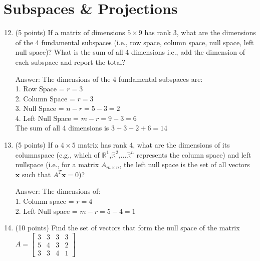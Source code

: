 \documentclass{article}%
\begin{document}
\section*{Subspaces \& Projections}
\begin{enumerate}
    \setcounter{enumi}{11}
        \item (5 points) If a matrix of dimensions $5 \times 9$ has rank 3, what are the dimensions of the 4 fundamental subspaces (i.e., row space, column space, null space, left null space)? What is the sum of all 4 dimensions i.e., add the dimension of each subspace and report the total?


         Answer: The dimensions of the 4 fundamental subspaces are: \\
         1. Row Space = $r = 3$ \\
         2. Column Space = $r = 3$ \\
         3. Null Space = $n - r = 5 - 3 = 2$ \\
         4. Left Null Space = $m - r = 9 - 3 = 6$ \\
         The sum of all 4 dimensions is $3 + 3 + 2 + 6 = 14$

        
        \item (5 points) If a $4 \times 5$ matrix has rank 4, what are the dimensions of its columnspace (e.g., which of $\mathbb{R}^{1}$,$\mathbb{R}^{2}$,...$\mathbb{R}^{n}$ represents the column space) and left nullspace (i.e., for a matrix $A_{m\times n}$, the left null space is the set of all vectors $\mathbf{x}$ such that $A^T\mathbf{x} = 0$)?


        Answer: The dimensions of: \\
        1. Column space = $r = 4$ \\
        2. Left Null space = $m - r = 5 - 4 = 1$

    
    \item (10 points) Find the set of vectors that form the null space of the matrix\hspace{0.4ex}
       $A =  \begin{bmatrix}
        3 & 3 & 3 & 3 \\
        5 & 4 & 3 & 2 \\
        3 & 3 & 4 & 1
    \end{bmatrix}$



\end{enumerate}
\end{document}
